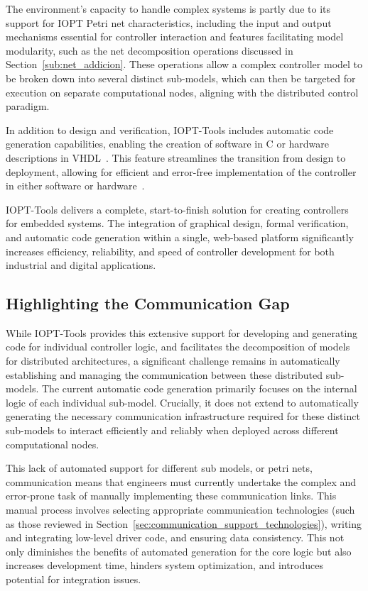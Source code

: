 The environment's capacity to handle complex systems is partly due to its support for IOPT Petri net characteristics, including the input and output mechanisms essential for controller interaction and features facilitating model modularity, such as the net decomposition operations discussed in Section~\ref{sub:net_addicion}. These operations allow a complex controller model to be broken down into several distinct sub-models, which can then be targeted for execution on separate computational nodes, aligning with the distributed control paradigm.


In addition to design and verification, IOPT-Tools includes automatic code generation capabilities, enabling the creation of software in C or hardware descriptions in VHDL~\cite{vhld}. This feature streamlines the transition from design to deployment, allowing for efficient and error-free implementation of the controller in either software or hardware~\cite{manual}.

IOPT-Tools delivers a complete, start-to-finish solution for creating controllers for embedded systems. The integration of graphical design, formal verification, and automatic code generation within a single, web-based platform significantly increases efficiency, reliability, and speed of controller development for both industrial and digital applications.


\subsection{Highlighting the Communication Gap}
\label{subsec:communication_gap}

While IOPT-Tools provides this extensive support for developing and generating code for individual controller logic, and facilitates the decomposition of models for distributed architectures, a significant challenge remains in automatically establishing and managing the communication between these distributed sub-models. The current automatic code generation primarily focuses on the internal logic of each individual sub-model. Crucially, it does not extend to automatically generating the necessary communication infrastructure required for these distinct sub-models to interact efficiently and reliably when deployed across different computational nodes.

This lack of automated support for different sub models, or petri nets, communication means that engineers must currently undertake the complex and error-prone task of manually implementing these communication links. This manual process involves selecting appropriate communication technologies (such as those reviewed in Section~\ref{sec:communication_support_technologies}), writing and integrating low-level driver code, and ensuring data consistency. This not only diminishes the benefits of automated generation for the core logic but also increases development time, hinders system optimization, and introduces potential for integration issues.

